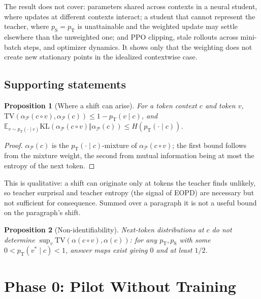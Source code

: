 \documentclass[11pt]{article}
\newtheorem{proposition}{Proposition}
\theoremstyle{definition}
\theoremstyle{remark}
\newcommand{\pT}{p_{\mathrm{T}}}
\newcommand{\pS}{p_{\mathrm{S}}}
\newcommand{\KL}{\mathrm{KL}}
\newcommand{\TV}{\mathrm{TV}}
\newcommand{\E}{\mathbb{E}}
\begin{document}
The result does not cover: parameters shared across contexts in a neural student, where updates at different contexts interact; a student that cannot represent the teacher, where $\pS=\pT$ is unattainable and the weighted update may settle elsewhere than the unweighted one; and PPO clipping, stale rollouts across mini-batch steps, and optimizer dynamics. It shows only that the weighting does not create new stationary points in the idealized contextwise case.

\subsection{Supporting statements}

\begin{proposition}[Where a shift can arise]
\label{prop:where}
For a token context $c$ and token $v$, $\TV(\alpha_{\mathcal P}(c\circ v),\alpha_{\mathcal P}(c))\le1-\pT(v\mid c)$, and $\E_{v\sim\pT(\cdot\mid c)}\KL(\alpha_{\mathcal P}(c\circ v)\Vert\alpha_{\mathcal P}(c))\le H(\pT(\cdot\mid c))$.
\end{proposition}
\begin{proof}
$\alpha_{\mathcal P}(c)$ is the $\pT(\cdot\mid c)$-mixture of $\alpha_{\mathcal P}(c\circ v)$; the first bound follows from the mixture weight, the second from mutual information being at most the entropy of the next token.
\end{proof}

This is qualitative: a shift can originate only at tokens the teacher finds unlikely, so teacher surprisal and teacher entropy (the signal of EOPD) are necessary but not sufficient for consequence. Summed over a paragraph it is not a useful bound on the paragraph's shift.

\begin{proposition}[Non-identifiability]
\label{prop:nonid}
Next-token distributions at $c$ do not determine $\sup_v\TV(\alpha(c\circ v),\alpha(c))$: for any $\pT,\pS$ with some $0<\pT(v^\ast\mid c)<1$, answer maps exist giving $0$ and at least $1/2$.
\end{proposition}

\section{Phase 0: Pilot Without Training}
\label{sec:phase0}
\end{document}
